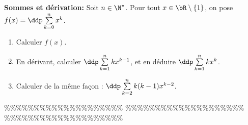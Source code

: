 



\begin{exercice}  \; \textbf{Sommes et d\'erivation:} Soit $n\in\N^{\star}$. Pour tout $x\in\bR\setminus\lbrace 1\rbrace$, on pose $f(x)=\ddp \sum\limits_{k=0}^n x^k$.
\begin{enumerate}
\item Calculer $f(x)$.
\item En d\'erivant, calculer $\ddp \sum\limits_{k=1}^n kx^{k-1}$, et en d\'eduire $\ddp \sum\limits_{k=1}^n kx^k$.
\item Calculer de la m\^eme fa\c con : $\ddp \sum\limits_{k=2}^n k(k-1)x^{k-2}$.
\end{enumerate}

\end{exercice}


\%\%\%\%\%\%\%\%\%\%\%\%\%\%\%\%\%\%\%\%
\%\%\%\%\%\%\%\%\%\%\%\%\%\%\%\%\%\%\%\%
\%\%\%\%\%\%\%\%\%\%\%\%\%\%\%\%\%\%\%\%




